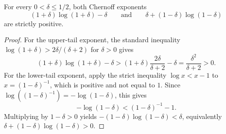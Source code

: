 \begin{helper}
For every \(0<\delta\le 1/2\), both Chernoff exponents
\[
  (1+\delta)\log(1+\delta)-\delta
  \qquad\text{and}\qquad
  \delta+(1-\delta)\log(1-\delta)
\]
are strictly positive.
\end{helper}
\begin{proof}
For the upper-tail exponent, the standard inequality
\(\log(1+\delta)>2\delta/(\delta+2)\) for \(\delta>0\) gives
\[
(1+\delta)\log(1+\delta)-\delta
>
(1+\delta)\frac{2\delta}{\delta+2}-\delta
=\frac{\delta^2}{\delta+2}>0 .
\]
For the lower-tail exponent, apply the strict inequality
\(\log x<x-1\) to \(x=(1-\delta)^{-1}\), which is positive and not equal to
\(1\).  Since \(\log((1-\delta)^{-1})=-\log(1-\delta)\), this gives
\[
-\log(1-\delta)<(1-\delta)^{-1}-1.
\]
Multiplying by \(1-\delta>0\) yields
\(-(1-\delta)\log(1-\delta)<\delta\), equivalently
\(\delta+(1-\delta)\log(1-\delta)>0\).
\end{proof}
